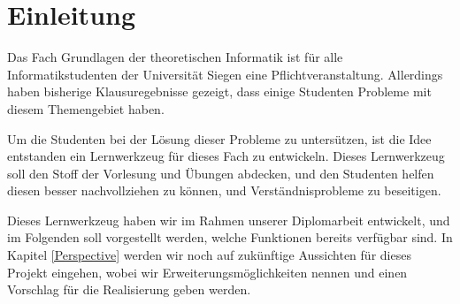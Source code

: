 

\chapter{Einleitung}\label{Introduction}

Das Fach Grundlagen der theoretischen Informatik ist für alle
Informatikstudenten der Universität Siegen eine Pflichtveranstaltung. Allerdings
haben bisherige Klausuregebnisse gezeigt, dass einige Studenten Probleme mit diesem
Themengebiet haben.\vspace{10pt}

Um die Studenten bei der Lösung dieser Probleme zu untersützen, ist die Idee
entstanden ein Lernwerkzeug für dieses Fach zu entwickeln. Dieses Lernwerkzeug soll den
Stoff der Vorlesung und Übungen abdecken, und den Studenten helfen diesen
besser nachvollziehen zu können, und Verständnisprobleme zu
beseitigen.\vspace{10pt}

Dieses Lernwerkzeug haben wir im Rahmen unserer Diplomarbeit entwickelt, und im
Folgenden soll vorgestellt werden, welche Funktionen bereits verfügbar sind. In
Kapitel \ref{Perspective} werden wir noch auf zukünftige Aussichten für dieses
Projekt eingehen, wobei wir Erweiterungsmöglichkeiten nennen und einen Vorschlag
für die Realisierung geben werden.\vspace{10pt}
